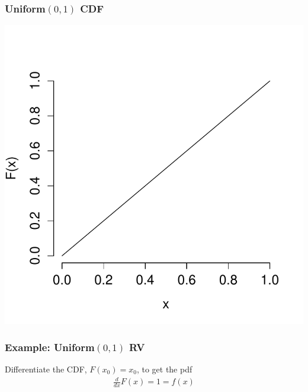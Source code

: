 \documentclass[handout]{beamer}
\begin{document}
\begin{frame}
\frametitle{Uniform$(0,1)$ CDF}
\centering
	\includegraphics[scale = 0.6]{./images/uniform_CDF}

\end{frame}


\begin{frame}
\frametitle{Example: Uniform$(0,1)$ RV}
Differentiate the CDF, $F(x_0) = x_0$, to get the pdf
 \begin{eqnarray*}
	\frac{d}{dx}F(x) =  1 = f(x)
 \end{eqnarray*}
\end{frame}
\end{document}
